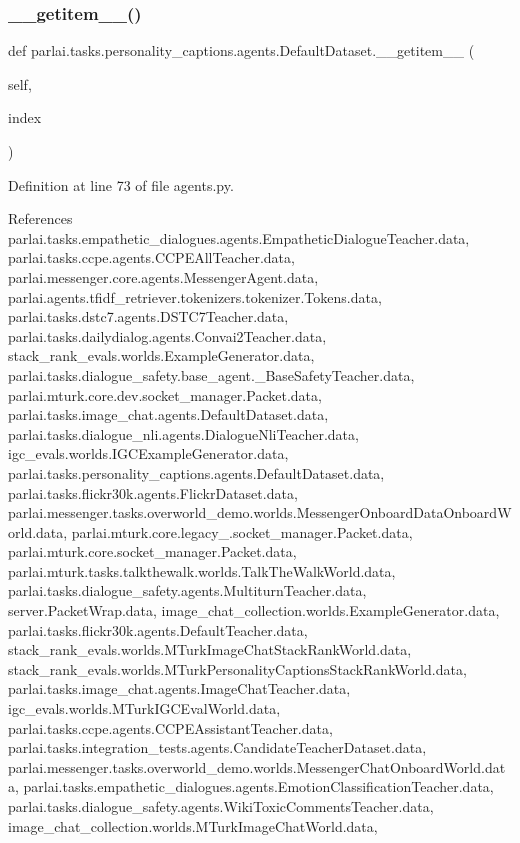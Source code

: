 \subsubsection{\texorpdfstring{\+\_\+\+\_\+getitem\+\_\+\+\_\+()}{\_\_getitem\_\_()}}
{\footnotesize\ttfamily def parlai.\+tasks.\+personality\+\_\+captions.\+agents.\+Default\+Dataset.\+\_\+\+\_\+getitem\+\_\+\+\_\+ (\begin{DoxyParamCaption}\item[{}]{self,  }\item[{}]{index }\end{DoxyParamCaption})}



Definition at line 73 of file agents.\+py.



References parlai.\+tasks.\+empathetic\+\_\+dialogues.\+agents.\+Empathetic\+Dialogue\+Teacher.\+data, parlai.\+tasks.\+ccpe.\+agents.\+C\+C\+P\+E\+All\+Teacher.\+data, parlai.\+messenger.\+core.\+agents.\+Messenger\+Agent.\+data, parlai.\+agents.\+tfidf\+\_\+retriever.\+tokenizers.\+tokenizer.\+Tokens.\+data, parlai.\+tasks.\+dstc7.\+agents.\+D\+S\+T\+C7\+Teacher.\+data, parlai.\+tasks.\+dailydialog.\+agents.\+Convai2\+Teacher.\+data, stack\+\_\+rank\+\_\+evals.\+worlds.\+Example\+Generator.\+data, parlai.\+tasks.\+dialogue\+\_\+safety.\+base\+\_\+agent.\+\_\+\+Base\+Safety\+Teacher.\+data, parlai.\+mturk.\+core.\+dev.\+socket\+\_\+manager.\+Packet.\+data, parlai.\+tasks.\+image\+\_\+chat.\+agents.\+Default\+Dataset.\+data, parlai.\+tasks.\+dialogue\+\_\+nli.\+agents.\+Dialogue\+Nli\+Teacher.\+data, igc\+\_\+evals.\+worlds.\+I\+G\+C\+Example\+Generator.\+data, parlai.\+tasks.\+personality\+\_\+captions.\+agents.\+Default\+Dataset.\+data, parlai.\+tasks.\+flickr30k.\+agents.\+Flickr\+Dataset.\+data, parlai.\+messenger.\+tasks.\+overworld\+\_\+demo.\+worlds.\+Messenger\+Onboard\+Data\+Onboard\+World.\+data, parlai.\+mturk.\+core.\+legacy\+\_.\+socket\+\_\+manager.\+Packet.\+data, parlai.\+mturk.\+core.\+socket\+\_\+manager.\+Packet.\+data, parlai.\+mturk.\+tasks.\+talkthewalk.\+worlds.\+Talk\+The\+Walk\+World.\+data, parlai.\+tasks.\+dialogue\+\_\+safety.\+agents.\+Multiturn\+Teacher.\+data, server.\+Packet\+Wrap.\+data, image\+\_\+chat\+\_\+collection.\+worlds.\+Example\+Generator.\+data, parlai.\+tasks.\+flickr30k.\+agents.\+Default\+Teacher.\+data, stack\+\_\+rank\+\_\+evals.\+worlds.\+M\+Turk\+Image\+Chat\+Stack\+Rank\+World.\+data, stack\+\_\+rank\+\_\+evals.\+worlds.\+M\+Turk\+Personality\+Captions\+Stack\+Rank\+World.\+data, parlai.\+tasks.\+image\+\_\+chat.\+agents.\+Image\+Chat\+Teacher.\+data, igc\+\_\+evals.\+worlds.\+M\+Turk\+I\+G\+C\+Eval\+World.\+data, parlai.\+tasks.\+ccpe.\+agents.\+C\+C\+P\+E\+Assistant\+Teacher.\+data, parlai.\+tasks.\+integration\+\_\+tests.\+agents.\+Candidate\+Teacher\+Dataset.\+data, parlai.\+messenger.\+tasks.\+overworld\+\_\+demo.\+worlds.\+Messenger\+Chat\+Onboard\+World.\+data, parlai.\+tasks.\+empathetic\+\_\+dialogues.\+agents.\+Emotion\+Classification\+Teacher.\+data, parlai.\+tasks.\+dialogue\+\_\+safety.\+agents.\+Wiki\+Toxic\+Comments\+Teacher.\+data, image\+\_\+chat\+\_\+collection.\+worlds.\+M\+Turk\+Image\+Chat\+World.\+data, 